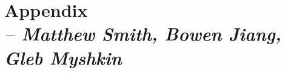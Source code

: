 \chapter{Appendix\\
\small{\textit{--  Matthew Smith, Bowen Jiang, Gleb Myshkin}}}
\label{Chapter:Appendix}

